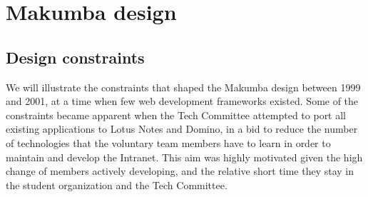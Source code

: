 \documentclass{chi2009}
\begin{document}



\section{Makumba design}\label{sec:makumba}

\subsection{Design constraints}\label{sec:constraints}
We will illustrate the constraints that shaped the Makumba design between 1999 and 2001, at a time when few web development frameworks existed. Some of the constraints became apparent when the Tech Committee attempted to port all existing applications to Lotus Notes and Domino, in a bid to reduce the number of technologies that the voluntary team members have to learn in order to maintain and develop the Intranet. This aim was highly motivated given the high change of members actively developing, and the relative short time they stay in the student organization and the Tech Committee.
\end{document}
